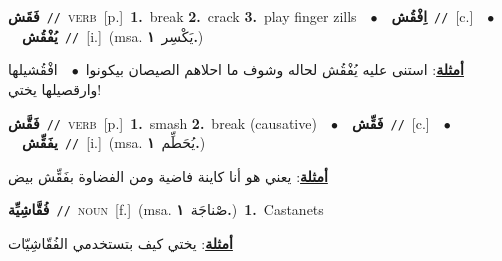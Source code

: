 \documentclass[10pt,a4paper,twoside]{article} %
\begin{document}
\begin{multicols}{2}
{\setlength\topsep{0pt}\textbf{\foreignlanguage{arabic}{فَقَش}}\ {\color{gray}\texttt{//}\color{black}}\ \textsc{verb}\ [p.]\ \textbf{1.}~break  \textbf{2.}~crack  \textbf{3.}~play finger zills\ \ $\bullet$\ \ \setlength\topsep{0pt}\textbf{\foreignlanguage{arabic}{اِفْقُش}}\ {\color{gray}\texttt{//}\color{black}}\ [c.]\ \ $\bullet$\ \ \setlength\topsep{0pt}\textbf{\foreignlanguage{arabic}{يُفْقُش}}\ {\color{gray}\texttt{//}\color{black}}\ [i.]\ \color{gray}(msa. \foreignlanguage{arabic}{يَكْسِر}~\foreignlanguage{arabic}{\textbf{١.}})\color{black}\  \begin{flushright}\color{gray}\foreignlanguage{arabic}{\textbf{\underline{\foreignlanguage{arabic}{أمثلة}}}: استنى عليه يُفْقُش لحاله وشوف ما احلاهم الصيصان بيكونوا\ $\bullet$\ \  افْقُشيلها وارقصيلها يختي!}\end{flushright}\color{black}} \vspace{2mm}

{\setlength\topsep{0pt}\textbf{\foreignlanguage{arabic}{فَقَّش}}\ {\color{gray}\texttt{//}\color{black}}\ \textsc{verb}\ [p.]\ \textbf{1.}~smash  \textbf{2.}~break (causative)\ \ $\bullet$\ \ \setlength\topsep{0pt}\textbf{\foreignlanguage{arabic}{فَقِّش}}\ {\color{gray}\texttt{//}\color{black}}\ [c.]\ \ $\bullet$\ \ \setlength\topsep{0pt}\textbf{\foreignlanguage{arabic}{يفَقِّش}}\ {\color{gray}\texttt{//}\color{black}}\ [i.]\ \color{gray}(msa. \foreignlanguage{arabic}{يُحَطِّم}~\foreignlanguage{arabic}{\textbf{١.}})\color{black}\  \begin{flushright}\color{gray}\foreignlanguage{arabic}{\textbf{\underline{\foreignlanguage{arabic}{أمثلة}}}: يعني هو أنا كاينة فاضية ومن الفضاوة بفَقِّش بيض}\end{flushright}\color{black}} \vspace{2mm}

{\setlength\topsep{0pt}\textbf{\foreignlanguage{arabic}{فُقَّاشِيِّة}}\ {\color{gray}\texttt{//}\color{black}}\ \textsc{noun}\ [f.]\ \color{gray}(msa. \foreignlanguage{arabic}{صْناجَة}~\foreignlanguage{arabic}{\textbf{١.}})\color{black}\ \textbf{1.}~Castanets\  \begin{flushright}\color{gray}\foreignlanguage{arabic}{\textbf{\underline{\foreignlanguage{arabic}{أمثلة}}}: يختي كيف بتستخدمي الفُقّاشِيّات}\end{flushright}\color{black}} \vspace{2mm}


\end{multicols}
\end{document}
